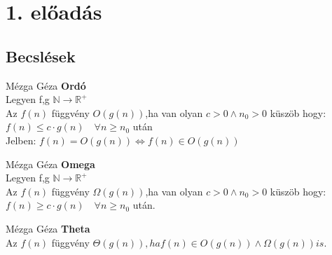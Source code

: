 \section{1. előadás}
\subsection{Becslések}

\begin{definicio}{Mézga Géza}
  \textbf{Ordó} \\[3pt]
  Legyen f,g $\mathbb{N} \rightarrow \mathbb{R}^+$ \\
  					 Az $f(n)$ függvény $O(g(n))$,ha van olyan $c > 0 \land n_0 > 0$ küszöb hogy: \\
  					 $f(n) \leq c \cdot g(n)\quad \forall n \geq n_0$ után\\[3pt]
  					 Jelben: $f(n) = O(g(n)) \Leftrightarrow f(n) \in O(g(n))$ \\[0pt]
\end{definicio}

\begin{definicio}{Mézga Géza}
  \textbf{Omega} \\[3pt]
  		Legyen f,g $\mathbb{N} \rightarrow \mathbb{R}^+$ \\
  					 Az $f(n)$ függvény $\Omega (g(n))$,ha van olyan $c > 0 \land n_0 > 0$ küszöb hogy: \\
  					 $f(n) \geq c \cdot g(n)\quad \forall n \geq n_0$ után.\\[6pt]
\end{definicio}

\begin{definicio}{Mézga Géza}
	\textbf{Theta} \\[3pt]
  Az $f(n)$ függvény $\Theta (g(n)), ha f(n) \in O(g(n)) \land \Omega (g(n)) is.$
\end{definicio}
